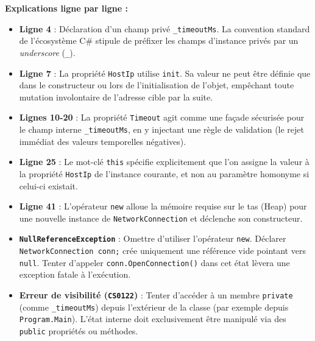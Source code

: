 \textbf{Explications ligne par ligne :}
\begin{itemize}
    \item \textbf{Ligne 4} : Déclaration d'un champ privé \texttt{\_timeoutMs}. La convention standard de l'écosystème C\# stipule de préfixer les champs d'instance privés par un \textit{underscore} (\texttt{\_}).
    \item \textbf{Ligne 7} : La propriété \texttt{HostIp} utilise \texttt{init}. Sa valeur ne peut être définie que dans le constructeur ou lors de l'initialisation de l'objet, empêchant toute mutation involontaire de l'adresse cible par la suite.
    \item \textbf{Lignes 10-20} : La propriété \texttt{Timeout} agit comme une façade sécurisée pour le champ interne \texttt{\_timeoutMs}, en y injectant une règle de validation (le rejet immédiat des valeurs temporelles négatives).
    \item \textbf{Ligne 25} : Le mot-clé \texttt{this} spécifie explicitement que l'on assigne la valeur à la propriété \texttt{HostIp} de l'instance courante, et non au paramètre homonyme si celui-ci existait.
    \item \textbf{Ligne 41} : L'opérateur \texttt{new} alloue la mémoire requise sur le tas (Heap) pour une nouvelle instance de \texttt{NetworkConnection} et déclenche son constructeur.
\end{itemize}

\begin{tcolorbox}[colback=white,colframe=keywordcolor,title=\textbf{Pièges courants \& Erreurs de compilation}]
    \begin{itemize}
        \item \textbf{\texttt{NullReferenceException}} : Omettre d'utiliser l'opérateur \texttt{new}. Déclarer \texttt{NetworkConnection conn;} crée uniquement une référence vide pointant vers \texttt{null}. Tenter d'appeler \texttt{conn.OpenConnection()} dans cet état lèvera une exception fatale à l'exécution.
        \item \textbf{Erreur de visibilité (\texttt{CS0122})} : Tenter d'accéder à un membre \texttt{private} (comme \texttt{\_timeoutMs}) depuis l'extérieur de la classe (par exemple depuis \texttt{Program.Main}). L'état interne doit exclusivement être manipulé via des \texttt{public} propriétés ou méthodes.
    \end{itemize}
\end{tcolorbox}


